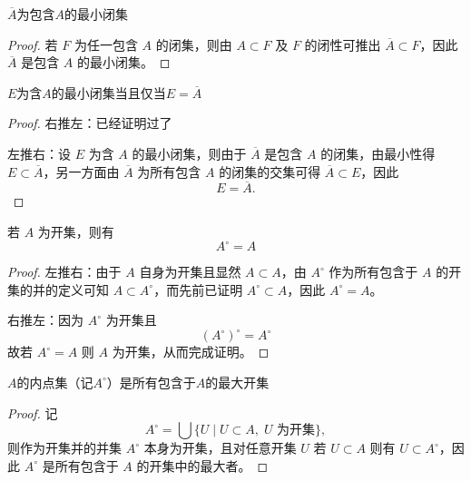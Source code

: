 \documentclass[lang=cn,a4paper,newtx,figureplace=section,tableplace=section]{elegantbook}
\begin{document}
\begin{proposition}
    $\overline{A}$为包含$A$的最小闭集
\end{proposition}
\begin{proof}
    若 $F$ 为任一包含 $A$ 的闭集，则由 $A\subset F$ 及 $F$ 的闭性可推出 $\overline{A}\subset F$，因此 $\overline{A}$ 是包含 $A$ 的最小闭集。
\end{proof}
\begin{remark}

    $E$为含$A$的最小闭集当且仅当$E=\overline{A}$
\end{remark}
\begin{proof}

    右推左：已经证明过了

    左推右：设 $E$ 为含 $A$ 的最小闭集，则由于 $\overline{A}$ 是包含 $A$ 的闭集，由最小性得 $E\subset\overline{A}$，另一方面由 $\overline{A}$ 为所有包含 $A$ 的闭集的交集可得 $\overline{A}\subset E$，因此
\begin{equation}
E=\overline{A}.
\end{equation}
\end{proof}


\begin{proposition}
    若 $A$ 为开集，则有
\begin{equation}
A^\circ=A
\end{equation}
\end{proposition}

\begin{proof}
    左推右：由于 $A$ 自身为开集且显然 $A\subset A$，由 $A^\circ$ 作为所有包含于 $A$ 的开集的并的定义可知 $A\subset A^\circ$，而先前已证明 $A^\circ\subset A$，因此 $A^\circ=A$。

    右推左：因为 $A^\circ$ 为开集且
\begin{equation}
(A^\circ)^\circ = A^\circ
\end{equation}
故若 $A^\circ=A$ 则 $A$ 为开集，从而完成证明。
\end{proof}
\begin{proposition}
    
$A$的内点集（记$A^\circ$）是所有包含于$A$的最大开集
\end{proposition}
\begin{proof}
    记
\begin{equation}
A^\circ=\bigcup\{U\mid U\subset A,\; U\text{ 为开集}\},
\end{equation}
则作为开集并的并集 $A^\circ$ 本身为开集，且对任意开集 $U$ 若 $U\subset A$ 则有 $U\subset A^\circ$，因此 $A^\circ$ 是所有包含于 $A$ 的开集中的最大者。
\end{proof}
\end{document}
